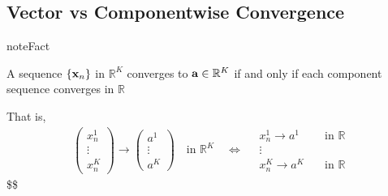 \documentclass[letterpaper,10pt,english]{jupyterBook}
\begin{document}
\begin{figure}[htbp]
\centering

\noindent{}
\end{figure}

\begin{figure}[htbp]
\centering

\noindent{}
\end{figure}

\begin{figure}[htbp]
\centering

\noindent{}
\end{figure}


\subsection{Vector vs Componentwise Convergence}
\label{\detokenize{04.basic_analysis:vector-vs-componentwise-convergence}}
\begin{sphinxadmonition}{note}{Fact}

\sphinxAtStartPar
A sequence \(\{{\bf x}_n\}\) in \(\mathbb{R}^K\) converges to \({\bf a} \in \mathbb{R}^K\)
if and only if each component sequence converges in \(\mathbb{R}\)

\sphinxAtStartPar
That is,
\begin{equation*}
\begin{split}
\begin{pmatrix}
x^1_n \\
\vdots \\
x^K_n 
\end{pmatrix}
\to
\begin{pmatrix}
a^1 \\
\vdots \\
a^K 
\end{pmatrix}
\quad \text{in } \mathbb{R}^K
\quad \iff \quad
\begin{array}{cc}
x^1_n \to a^1 &  \quad \text{in } \mathbb{R} \\
\vdots        &  \\
x^K_n \to a^K &  \quad \text{in } \mathbb{R} 
\end{array}
\end{split}
\end{equation*}
\sphinxAtStartPar
\$\$
\end{sphinxadmonition}

\begin{figure}[htbp]
\centering

\noindent{}
\end{figure}
\end{document}
